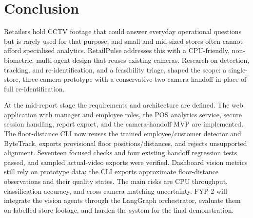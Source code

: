 \chapter{Conclusion}
Retailers hold CCTV footage that could answer everyday operational questions but is rarely used for that purpose, and small and mid-sized stores often cannot afford specialised analytics. RetailPulse addresses this with a CPU-friendly, non-biometric, multi-agent design that reuses existing cameras. Research on detection, tracking, and re-identification, and a feasibility triage, shaped the scope: a single-store, three-camera prototype with a conservative two-camera handoff in place of full re-identification.

At the mid-report stage the requirements and architecture are defined. The web application with manager and employee roles, the POS analytics service, secure session handling, report export, and the camera-handoff MVP are implemented. The floor-distance CLI now reuses the trained employee/customer detector and ByteTrack, exports provisional floor positions/distances, and rejects unsupported alignment. Seventeen focused checks and four existing handoff regression tests passed, and sampled actual-video exports were verified. Dashboard vision metrics still rely on prototype data; the CLI exports approximate floor-distance observations and their quality states. The main risks are CPU throughput, classification accuracy, and cross-camera matching uncertainty. FYP-2 will integrate the vision agents through the LangGraph orchestrator, evaluate them on labelled store footage, and harden the system for the final demonstration.
